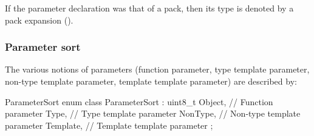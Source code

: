 If the parameter declaration was that of a pack, then its type is denoted by a pack expansion ().



\subsubsection{Parameter sort}
\label{sec:ifc-parameter-sort}

The various notions of parameters (function parameter, type template parameter, non-type template parameter, template template parameter) are described by:
\begin{typedef}{ParameterSort}{}
	enum class ParameterSort : uint8_t {
		Object,					// Function parameter
		Type,						// Type template parameter
		NonType,					// Non-type template parameter
		Template,					// Template template parameter
	};
\end{typedef}

\subsection{} 
\label{sec:ifc:DeclSort:Field}

